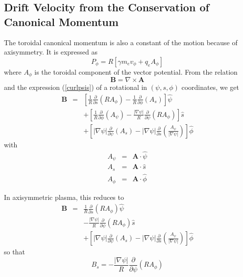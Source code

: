 \subsection{Drift Velocity from the Conservation of Canonical Momentum}

The toroidal canonical momentum is also a constant of the motion because of
axisymmetry. It is expressed as
\begin{equation}
P_{\phi }=R\left[ \gamma m_{e}v_{\phi }+q_{e}A_{\phi }\right]
\end{equation}
where $A_{\phi }$ is the toroidal component of the vector potential. From
the relation
\begin{equation}
\mathbf{B}=\nabla \times \mathbf{A}
\end{equation}
and the expression (\ref{curlpsis}) of a rotational in $\left( \psi ,s,\phi
\right) $ coordinates, we get
\begin{eqnarray}
\mathbf{B} &=&\left[ \frac{1}{R}\frac{\partial }{\partial s}\left( RA_{\phi
}\right) -\frac{1}{R}\frac{\partial }{\partial \phi }\left( A_{s}\right)
\right] \widehat{\psi }  \nonumber \\
&&+\left[ \frac{1}{R}\frac{\partial }{\partial \phi }\left( A_{\psi }\right)
-\frac{\left| \nabla \psi \right| }{R}\frac{\partial }{\partial \psi }\left(
RA_{\phi }\right) \right] \widehat{s}  \nonumber \\
&&+\left[ \left| \nabla \psi \right| \frac{\partial }{\partial \psi }\left(
A_{s}\right) -\left| \nabla \psi \right| \frac{\partial }{\partial s}\left(
\frac{A_{\psi }}{\left| \nabla \psi \right| }\right) \right] \widehat{\phi }
\end{eqnarray}
with
\begin{eqnarray}
A_{\psi } &=&\mathbf{A}\cdot \widehat{\psi } \\
A_{s} &=&\mathbf{A}\cdot \widehat{s} \\
A_{\phi } &=&\mathbf{A}\cdot \widehat{\phi }
\end{eqnarray}

In axisymmetric plasma, this reduces to
\begin{eqnarray}
\mathbf{B} &=&\frac{1}{R}\frac{\partial }{\partial s}\left( RA_{\phi
}\right) \widehat{\psi }  \nonumber \\
&&-\frac{\left| \nabla \psi \right| }{R}\frac{\partial }{\partial \psi }%
\left( RA_{\phi }\right) \widehat{s}  \nonumber \\
&&+\left[ \left| \nabla \psi \right| \frac{\partial }{\partial \psi }\left(
A_{s}\right) -\left| \nabla \psi \right| \frac{\partial }{\partial s}\left(
\frac{A_{\psi }}{\left| \nabla \psi \right| }\right) \right] \widehat{\phi }
\label{bpsi}
\end{eqnarray}
so that
\begin{equation}
B_{s}=-\frac{\left| \nabla \psi \right| }{R}\frac{\partial }{\partial \psi }%
\left( RA_{\phi }\right)
\end{equation}

